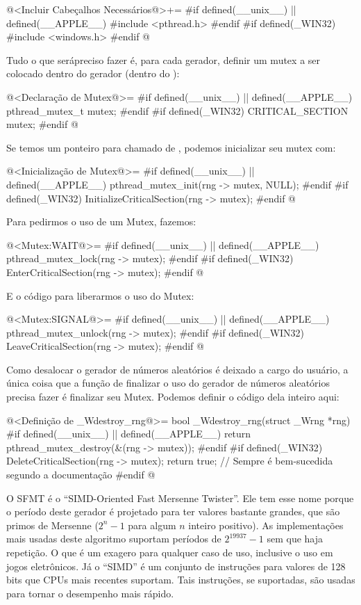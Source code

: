 \iniciocodigo
@<Incluir Cabeçalhos Necessários@>+=
#if defined(__unix__) || defined(__APPLE__)
#include <pthread.h>
#endif
#if defined(_WIN32)
#include <windows.h>
#endif
@
\fimcodigo

Tudo o que serápreciso fazer é, para cada gerador, definir um mutex a
ser colocado dentro do gerador (dentro do ):

\iniciocodigo
@<Declaração de Mutex@>=
#if defined(__unix__) || defined(__APPLE__)
pthread_mutex_t mutex;
#endif
#if defined(_WIN32)
CRITICAL_SECTION mutex;
#endif
@
\fimcodigo

Se temos um ponteiro para  chamado
de , podemos inicializar seu mutex com:

\iniciocodigo
@<Inicialização de Mutex@>=
#if defined(__unix__) || defined(__APPLE__)
pthread_mutex_init(rng -> mutex, NULL);
#endif
#if defined(_WIN32)
InitializeCriticalSection(rng -> mutex);
#endif
@
\fimcodigo

Para pedirmos o uso de um Mutex, fazemos:

\iniciocodigo
@<Mutex:WAIT@>=
#if defined(__unix__) || defined(__APPLE__)
pthread_mutex_lock(rng -> mutex);
#endif
#if defined(_WIN32)
EnterCriticalSection(rng -> mutex);
#endif
@
\fimcodigo

E o código para liberarmos o uso do Mutex:

\iniciocodigo
@<Mutex:SIGNAL@>=
#if defined(__unix__) || defined(__APPLE__)
pthread_mutex_unlock(rng -> mutex);
#endif
#if defined(_WIN32)
LeaveCriticalSection(rng -> mutex);
#endif
@
\fimcodigo

Como desalocar o gerador de números aleatórios é deixado a cargo do
usuário, a única coisa que a função de finalizar o uso do gerador de
números aleatórios precisa fazer é finalizar seu Mutex. Podemos
definir o código dela inteiro aqui:

\iniciocodigo
@<Definição de \_Wdestroy\_rng@>=
bool _Wdestroy_rng(struct _Wrng *rng){
#if defined(__unix__) || defined(__APPLE__)
  return pthread_mutex_destroy(&(rng -> mutex));
#endif
#if defined(_WIN32)
  DeleteCriticalSection(rng -> mutex);
  return true; // Sempre é bem-sucedida segundo a documentação
#endif
}
@
\fimcodigo



O SFMT é o ``SIMD-Oriented Fast Mersenne Twister''. Ele tem esse nome
porque o período deste gerador é projetado para ter valores bastante
grandes, que são primos de Mersenne ($2^n-1$ para algum $n$ inteiro
positivo). As implementações mais usadas deste algoritmo suportam
períodos de $2^{19937}-1$ sem que haja repetição. O que é um exagero
para qualquer caso de uso, inclusive o uso em jogos eletrônicos. Já o
``SIMD'' é um conjunto de instruções para valores de 128 bits que CPUs
mais recentes suportam. Tais instruções, se suportadas, são usadas
para tornar o desempenho mais rápido.

